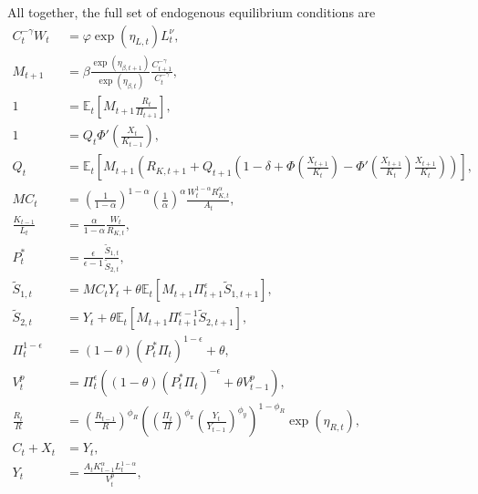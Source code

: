 \documentclass[12 pt, oneside]{article}
\theoremstyle{definition}
\theoremstyle{definition}
\theoremstyle{definition}
\newcommand{\E}{\mathbb{E}}
\begin{document}
All together, the full set of endogenous equilibrium conditions are
\begin{align}
  \label{eq:consumption labor eqm}
    C_t^{-\gamma} W_t & = \varphi\exp(\eta_{L, t}) L_t^\nu,\\
  \label{eq:stochastic discount factor}
  M_{t + 1} & = \beta\frac{\exp(\eta_{\beta, t + 1})}{\exp(\eta_{\beta, t})}\frac{C_{t + 1}^{-\gamma}}{C_t^{-\gamma}},\\
  \label{eq:euler eqn eqm}
  1 & = \E_t\left[M_{t + 1}\frac{R_t}{\Pi_{t + 1}}\right],\\
  \label{eq:tobins q eqm}
  1 & = Q_t \Phi'\left(\frac{X_t}{K_{t - 1}}\right),\\
  \label{eq:capital asset pricing eqm}
  Q_t & = \E_t\left[M_{t + 1} \left(R_{K, t + 1} + Q_{t + 1}\left(1  - \delta + \Phi\left(\frac{X_{t + 1}}{K_t}\right) - \Phi'\left(\frac{X_{t + 1}}{K_t}\right)\frac{X_{t + 1}}{K_t}\right)\right)\right],\\
  \label{eq:mc soln eqm}
  MC_t & =  \left(\frac{1}{1 - \alpha}\right)^{1 - \alpha}\left(\frac{1}{\alpha}\right)^{\alpha}\frac{W_t^{1 - \alpha}R_{K, t}^{\alpha}}{ A_t},\\
  \label{eq:optimal capital labor ratio eqm}
  \frac{K_{t - 1}}{L_t} & =\frac{\alpha}{1 - \alpha} \frac{W_t}{R_{K, t}},\\
  \label{eq:real optimal reset price eqm}
  P_t^* & = \frac{\epsilon}{\epsilon - 1}\frac{\tilde{S}_{1, t}}{\tilde{S}_{2, t}},\\
  \label{eq:numerator recursion eqm}
  \tilde{S}_{1, t} & = MC_t Y_t + \theta\E_t[M_{t + 1} \Pi_{t + 1}^\epsilon \tilde{S}_{1, t + 1}],\\
  \label{eq:denominator recursion eqm}
  \tilde{S}_{2, t} & =  Y_t + \theta\E_t[M_{t + 1} \Pi_{t + 1}^{\epsilon - 1} \tilde{S}_{2, t + 1}],\\
  \label{eq:inflation from optimal reset price eqm}
  \Pi_t^{ 1 - \epsilon} & = (1 - \theta) (P_t^*\Pi_t)^{1 - \epsilon} + \theta,\\
  \label{eq:price dispersion evol eqm}
  V_t^p & = \Pi_t^{\epsilon}((1 - \theta) (P_t^* \Pi_t)^{-\epsilon} + \theta V_{t - 1}^p),\\
  \label{eq:taylor rule eqm}
  \frac{R_t}{R} & =  \left(\frac{R_{t - 1}}{R}\right)^{\phi_R}\left(\left(\frac{\Pi_t}{\Pi}\right)^{\phi_\pi}\left(\frac{Y_t}{Y_{t - 1}}\right)^{\phi_y}\right)^{1 - \phi_R}\exp(\eta_{R, t}),\\
  \label{eq:output market clearing eqm}
  C_t + X_t & = Y_t,\\
  \label{eq:aggregate supply eqm}
  Y_t & = \frac{A_t K_{t - 1}^{\alpha}L_t^{1 - \alpha}}{V_t^p},
\end{align}
\end{document}
